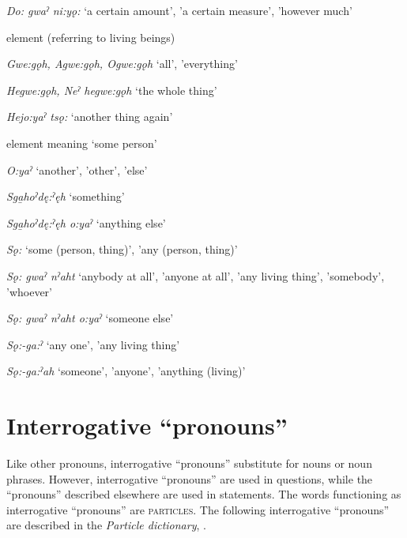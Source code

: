 \begin{CayugaRelated}
\item{} \textit{Do: gwaˀ ni:yǫ:} ‘a certain amount’, 'a certain measure’, 'however much’\\
\item{}  element (referring to living beings)\\
\item{} \textit{Gwe:gǫh, Agwe:gǫh, Ogwe:gǫh} ‘all’, 'everything’\\
\item{} \textit{Hegwe:gǫh, Neˀ hegwe:gǫh} ‘the whole thing’\\
\item{} \textit{Hejo:yaˀ tsǫ:} ‘another thing again’\\
\item{}  element meaning ‘some person’\\
\item{} \textit{O:yaˀ} ‘another’, 'other’, 'else’\\
\item{} \textit{Sga̱hoˀdę:ˀęh} ‘something’\\
\item{} \textit{Sga̱hoˀdę:ˀęh o:yaˀ} ‘anything else’\\
\item{} \textit{Sǫ:} ‘some (person, thing)’, 'any (person, thing)’\\
\item{} \textit{Sǫ: gwaˀ nˀaht} ‘anybody at all’, 'anyone at all’, 'any living thing’, 'somebody’, 'whoever’\\
\item{} \textit{Sǫ: gwaˀ nˀaht o:yaˀ} ‘someone else’\\
\item{} \textit{Sǫ:-ga:ˀ} ‘any one’, 'any living thing’\\
\item{} \textit{Sǫ:-ga:ˀah} ‘someone’, 'anyone’, 'anything (living)’\\
\end{CayugaRelated}

\section{Interrogative “pronouns”} \label{ch:’Interrogative pronouns’}
Like other pronouns, interrogative “pronouns” substitute for nouns or noun phrases. However, interrogative “pronouns” are used in questions, while the “pronouns” described elsewhere are used in statements. The words functioning as interrogative “pronouns” are \textsc{particles}. The following interrogative “pronouns” are described in the \textit{Particle dictionary}, .

